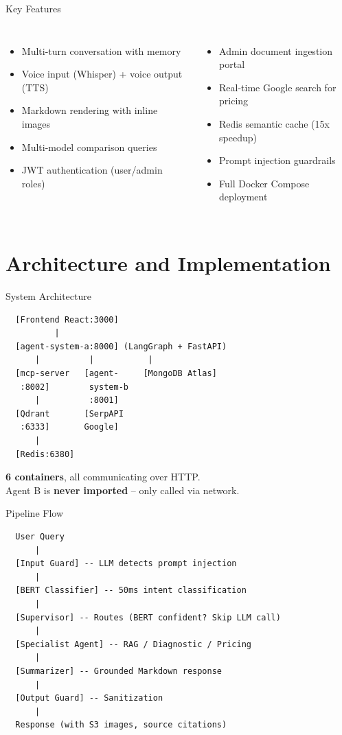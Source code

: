 \documentclass[aspectratio=169]{beamer}
\begin{document}
\begin{frame}{Key Features}
\begin{columns}
\begin{itemize}
  \item Multi-turn conversation with memory
  \item Voice input (Whisper) + voice output (TTS)
  \item Markdown rendering with inline images
  \item Multi-model comparison queries
  \item JWT authentication (user/admin roles)
\end{itemize}

\begin{itemize}
  \item Admin document ingestion portal
  \item Real-time Google search for pricing
  \item Redis semantic cache (15x speedup)
  \item Prompt injection guardrails
  \item Full Docker Compose deployment
\end{itemize}
\end{columns}
\end{frame}

\section{Architecture and Implementation}

\begin{frame}[fragile]{System Architecture}
\begin{verbatim}
  [Frontend React:3000]
          |
  [agent-system-a:8000] (LangGraph + FastAPI)
      |          |           |
  [mcp-server   [agent-     [MongoDB Atlas]
   :8002]        system-b
      |          :8001]
  [Qdrant       [SerpAPI
   :6333]       Google]
      |
  [Redis:6380]
\end{verbatim}

\small
\textbf{6 containers}, all communicating over HTTP.\\
Agent B is \textbf{never imported} -- only called via network.
\end{frame}

\begin{frame}[fragile]{Pipeline Flow}
\begin{verbatim}
  User Query
      |
  [Input Guard] -- LLM detects prompt injection
      |
  [BERT Classifier] -- 50ms intent classification
      |
  [Supervisor] -- Routes (BERT confident? Skip LLM call)
      |
  [Specialist Agent] -- RAG / Diagnostic / Pricing
      |
  [Summarizer] -- Grounded Markdown response
      |
  [Output Guard] -- Sanitization
      |
  Response (with S3 images, source citations)
\end{verbatim}
\end{frame}
\end{document}
